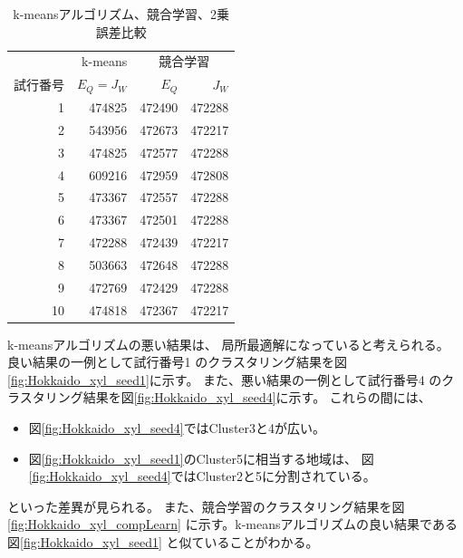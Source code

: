 \documentclass[a4j]{jarticle}
\begin{document}
\begin{table}[tbp]
 \begin{center}
  \caption{k-meansアルゴリズム、競合学習、2乗誤差比較}
  \label{tab:k-mean-comp}
  \begin{tabular}{|r||r|r|r|} \hline
            & k-means     & \multicolumn{2}{|c|}{競合学習} \\ \cline{2-4}
   試行番号 & $E_Q = J_W$                  & $E_Q$  & $J_W$  \\ \hline \hline
          1 &                       474825 & 472490 & 472288 \\ \hline
          2 & \cellcolor[gray]{0.8} 543956 & 472673 & 472217 \\ \hline
          3 &                       474825 & 472577 & 472288 \\ \hline
          4 & \cellcolor[gray]{0.8} 609216 & 472959 & 472808 \\ \hline
          5 &                       473367 & 472557 & 472288 \\ \hline
          6 &                       473367 & 472501 & 472288 \\ \hline
          7 &                       472288 & 472439 & 472217 \\ \hline
          8 & \cellcolor[gray]{0.8} 503663 & 472648 & 472288 \\ \hline
          9 &                       472769 & 472429 & 472288 \\ \hline
         10 &                       474818 & 472367 & 472217 \\ \hline
  \end{tabular}
 \end{center}
\end{table}

k-meansアルゴリズムの悪い結果は、
局所最適解になっていると考えられる。
良い結果の一例として試行番号1
のクラスタリング結果を図\ref{fig:Hokkaido_xyl_seed1}に示す。
また、悪い結果の一例として試行番号4
のクラスタリング結果を図\ref{fig:Hokkaido_xyl_seed4}に示す。
これらの間には、
\begin{itemize}
\item 図\ref{fig:Hokkaido_xyl_seed4}ではCluster3と4が広い。
\item 図\ref{fig:Hokkaido_xyl_seed1}のCluster5に相当する地域は、
      図\ref{fig:Hokkaido_xyl_seed4}ではCluster2と5に分割されている。
\end{itemize}
といった差異が見られる。
また、競合学習のクラスタリング結果を図\ref{fig:Hokkaido_xyl_compLearn}
に示す。k-meansアルゴリズムの良い結果である図\ref{fig:Hokkaido_xyl_seed1}
と似ていることがわかる。
\end{document}

